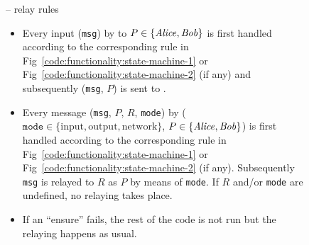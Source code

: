 
\begin{figure}[H]
  \begin{systembox}{\fchan -- relay rules}
    \begin{itemize}
      \item Every input (\texttt{msg}) by \environment to $P \in \{\mathit{Alice},
      \mathit{Bob}\}$ is first handled according to the corresponding rule in
      Fig~\ref{code:functionality:state-machine-1} or
      Fig~\ref{code:functionality:state-machine-2} (if any) and subsequently
      (\texttt{msg}, $P$) is sent to \adversary.
      \item Every message (\texttt{msg}, $P$, $R$, \texttt{mode}) by \adversary
      ($\texttt{mode} \in \{\mathrm{input}, \mathrm{output},
      \mathrm{network}\}$, $P \in \{\mathit{Alice}, \mathit{Bob}\}$) is first handled according
      to the corresponding rule in Fig~\ref{code:functionality:state-machine-1}
      or Fig~\ref{code:functionality:state-machine-2} (if any).  Subsequently
      \texttt{msg} is relayed to $R$ as $P$ by means of \texttt{mode}. If $R$
      and/or \texttt{mode} are undefined, no relaying takes place.
      \item If an ``ensure'' fails, the rest of the code is not run but the
      relaying happens as usual.
    \end{itemize}
  \end{systembox}
  \caption{}
  \label{code:functionality:rules}
\end{figure}

